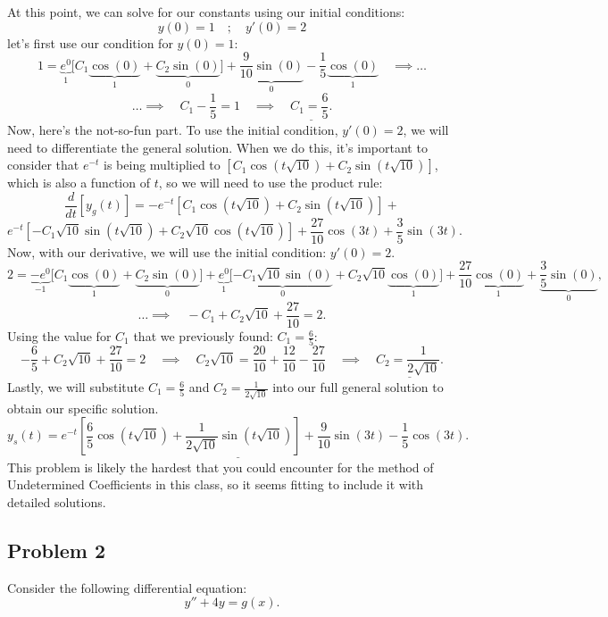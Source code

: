 \documentclass[a4paper,12pt]{article} %
\begin{document}
At this point, we can solve for our constants using our initial conditions:
$$ y(0) = 1 \quad ; \quad y'\left(0\right) = 2 $$
let's first use our condition for $y(0) = 1$:
$$ 1 = \underbrace{e^{0}}_1\bigg[C_1\underbrace{\cos(0)}_1 + \underbrace{C_2\sin(0)}_0\bigg] + \underbrace{\frac{9}{10}\sin{(0)}}_0 - \frac{1}{5}\underbrace{\cos{(0)}}_1 \quad\implies \ldots $$
$$ \ldots\implies \quad C_1 -\frac{1}{5} = 1 \quad\implies\quad \underline{C_1 = \frac{6}{5}.}$$
Now, here's the not-so-fun part. To use the initial condition, $y'(0)=2$, we will need to differentiate the general solution. When we do this, it's important to consider that $e^{-t}$ is being multiplied to $\left[C_1\cos{\left(t\sqrt{10}\right)} + C_2\sin{\left(t\sqrt{10}\right)}\right]$, which is also a function of $t$, so we will need to use the product rule:
$$ \frac{d}{dt}[y_g(t)] = -e^{-t}\left[C_1\cos{\left(t\sqrt{10}\right)} + C_2\sin{\left(t\sqrt{10}\right)}\right] +$$
$$e^{-t}\left[-C_1\sqrt{10}\sin{\left(t\sqrt{10}\right)} +C_2\sqrt{10}\cos{\left(t\sqrt{10}\right)}\right] +\frac{27}{10}\cos{(3t)} + \frac{3}{5}\sin{(3t)}. $$
Now, with our derivative, we will use the initial condition: $y'(0) = 2$.
$$ 2 = \underbrace{-e^{0}}_{-1}\bigg[C_1\underbrace{\cos(0)}_1 + \underbrace{C_2\sin(0)}_0\bigg] + \underbrace{e^{0}}_1\bigg[\underbrace{-C_1\sqrt{10}\sin(0)}_0 + C_2\sqrt{10}\underbrace{\cos(0)}_1\bigg] + \frac{27}{10}\underbrace{\cos(0)}_1 + \underbrace{\frac{3}{5}\sin(0)}_0, $$
$$\ldots\implies \quad -C_1 + C_2\sqrt{10} + \frac{27}{10} = 2.$$
Using the value for $C_1$ that we previously found: $C_1 = \frac{6}{5}$:
$$ -\frac{6}{5} + C_2\sqrt{10} +\frac{27}{10} = 2 \quad\implies \quad C_2\sqrt{10} =\frac{20}{10} + \frac{12}{10} - \frac{27}{10} \quad\implies \quad \underline{C_2 = \frac{1}{2\sqrt{10}}.} $$
Lastly, we will substitute $C_1 = \frac{6}{5}$ and $C_2 = \frac{1}{2\sqrt{10}}$ into our full general solution to obtain our specific solution.
$$ \underline{\boxed{y_s(t) = e^{-t}\left[
\frac{6}{5}\cos{\left(t\sqrt{10}\right)} + \frac{1}{2\sqrt{10}}\sin{\left(t\sqrt{10}\right)}\right] +  \frac{9}{10}\sin{(3t)} - \frac{1}{5}\cos{(3t).}}}$$
This problem is likely the hardest that you could encounter for the method of Undetermined Coefficients in this class, so it seems fitting to include it with detailed solutions.

\pagebreak

\subsection*{Problem 2} Consider the following differential equation:
$$ y'' + 4y = g(x). $$
\end{document}

